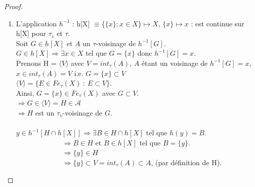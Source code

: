 \documentclass[11pt]{report}
\theoremstyle{styletheorem}
\theoremstyle{styledef}
\theoremstyle{remark}
\begin{document}
\begin{proof}
\begin{enumerate}
		$ \Rightarrow B \equiv \lbrace x \rbrace \cap V_k \neq \emptyset \  \forall k \in \lbrace 1, \dots,n \rbrace $ et $ B \subset \bigcup_{i=1}^{n} V_k $\\
		$ \Rightarrow B \in \langle V_1,V_2, \dots , V_n\rangle = G \subset H $\\
		$ \Rightarrow B \in H $\\
		i.e. $ h[M] \subset H $\\
		D'où $ \forall \tau_{v}$-voisinage H de $h(x)$ $\exists \tau$-voisinage M = $\bigcap_{k=1}^{n} V_{k} \ de \ x $ tel que $h[X \cap M ] = h[M] \subset ~H$\\ $ \Rightarrow$ h est continue en $x$ pour $\tau $ et $ \tau_{v}$\\
		D'où h est continue sur X car continue en tout $x \in X$.\\
		\item L'application $ h^{-1}$ : h[X] $ \equiv \lbrace \lbrace x \rbrace : x \in X \rbrace \longmapsto X$, $ \lbrace x \rbrace \mapsto x$ :  est continue sur h[X] pour $ \tau_{v}$ et $ \tau $. \\ Soit $G \in h[X]$ et $A$ un $\tau$-voisinage de $ h^{-1} [ G ].$\\
		$G \in h[X] \Rightarrow \exists x \in X $ tel que $G = \lbrace x \rbrace $ donc $  h^{-1}[G] = x$.\\
		Prenons H = $\langle V \rangle$ avec $ V = int_{\tau} (A)$, $A$  étant un voisinage de $h^{-1}[G] = x$, $ x \in int_{\tau} (A) = V  $ i.e. $G  = \lbrace x \rbrace \subset V$\\
		$ \langle V \rangle  = \lbrace E \in Fe_{\tau}(X) \ : \ E \subset V \rbrace $.\\ Ainsi, $ G = \lbrace x \rbrace \in Fe_{\tau}(X)$ avec $ G \subset V.$ \\
		$\Rightarrow G \in \langle V \rangle  = H \in \mathcal{A}  $\\
		$\Rightarrow H$ est un $\tau_v$-voisinage de $G$.\\ \\
		$y \in h^{-1} [H \cap h[X]] \Rightarrow \exists B \in H \cap h[X] $ tel que $h(y) = B$.\\
		\ \ \ \ \ \ \ \ \ \ \ \ \  $ \Rightarrow B \in H $ et $B \in h[X]$ tel que $B = \lbrace y \rbrace$.\\
		\ \ \ \ \ \ \ \ \ \ \ \ \ $ \Rightarrow  \lbrace y \rbrace \in H $\\
		\ \ \ \ \ \ \ \ \ \ \ \ \ $\Rightarrow \lbrace y \rbrace \subset V = int_{\tau} (A) \subset A $, (par définition de H).\\

\end{enumerate}
\end{proof}
\end{document}
